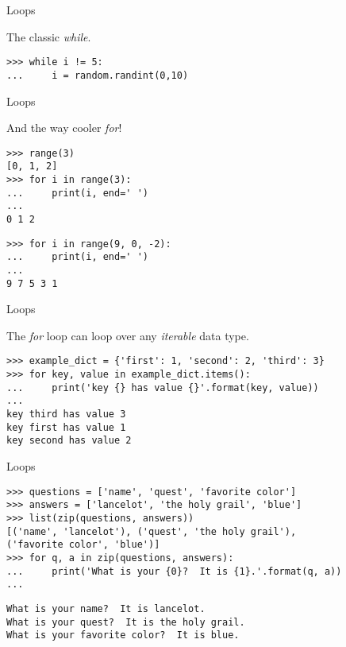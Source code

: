 \documentclass[ignorenonframetext,]{beamer}
\begin{document}
\begin{frame}[fragile]{Loops}

    The classic \emph{while}.

    \begin{tcolorbox}
    \begin{verbatim}
>>> while i != 5:
...     i = random.randint(0,10)
    \end{verbatim}
    \end{tcolorbox}
\end{frame}

\begin{frame}[fragile]{Loops}

    And the way cooler \emph{for}!

    \begin{tcolorbox}
    \begin{verbatim}
>>> range(3)
[0, 1, 2]
>>> for i in range(3):
...     print(i, end=' ')
...
0 1 2
    \end{verbatim}
    \end{tcolorbox}

    \pause
    \begin{tcolorbox}
    \begin{verbatim}
>>> for i in range(9, 0, -2):
...     print(i, end=' ')
...
9 7 5 3 1
    \end{verbatim}
    \end{tcolorbox}
\end{frame}

\begin{frame}[fragile]{Loops}

    The \emph{for} loop can loop over any \emph{iterable} data type.

    \begin{tcolorbox}
    \begin{verbatim}
>>> example_dict = {'first': 1, 'second': 2, 'third': 3}
>>> for key, value in example_dict.items():
...     print('key {} has value {}'.format(key, value))
...
key third has value 3
key first has value 1
key second has value 2
    \end{verbatim}
    \end{tcolorbox}
\end{frame}

\begin{frame}[fragile]{Loops}
    \begin{tcolorbox}
    \begin{verbatim}
>>> questions = ['name', 'quest', 'favorite color']
>>> answers = ['lancelot', 'the holy grail', 'blue']
>>> list(zip(questions, answers))
[('name', 'lancelot'), ('quest', 'the holy grail'),
('favorite color', 'blue')]
>>> for q, a in zip(questions, answers):
...     print('What is your {0}?  It is {1}.'.format(q, a))
...
    \end{verbatim}
    \begin{verbatim}
What is your name?  It is lancelot.
What is your quest?  It is the holy grail.
What is your favorite color?  It is blue.
    \end{verbatim}
    \end{tcolorbox}
\end{frame}
\end{document}

